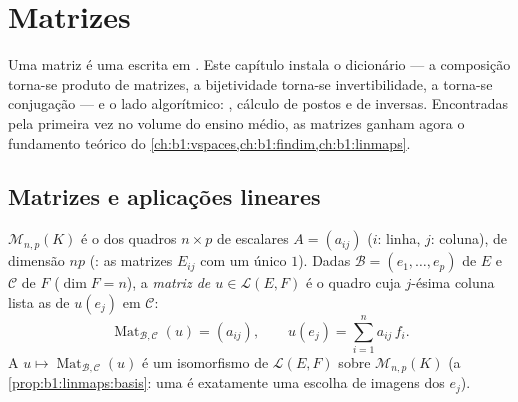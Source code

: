 \chapter{Matrizes}\label{ch:b1:matrices}

Uma matriz é uma  escrita em . Este
capítulo instala o dicionário --- a composição torna-se produto de
matrizes, a bijetividade torna-se invertibilidade, a 
torna-se conjugação --- e o lado algorítmico: ,
cálculo de postos e de inversas. Encontradas pela primeira vez no
volume do ensino médio, as matrizes ganham agora o fundamento teórico
do \cref{ch:b1:vspaces,ch:b1:findim,ch:b1:linmaps}.

\section{Matrizes e aplicações lineares}

\begin{definition}\label{def:b1:matrices:def}
$\mathcal{M}_{n,p}(K)$ é o  dos quadros $n \times p$ de escalares $A
= (a_{ij})$ ($i$:
linha, $j$: coluna), de dimensão $np$ (: as matrizes $E_{ij}$
com um único $1$). Dadas  $\mathcal{B} = (e_1, \dots, e_p)$ de $E$ e $\mathcal{C}$ de $F$ ($\dim F = n$),
a \emph{matriz de $u \in \mathcal{L}(E, F)$} é o quadro cuja $j$-ésima coluna lista as
 de $u(e_j)$ em $\mathcal{C}$:
\[
\operatorname{Mat}_{\mathcal{B},\mathcal{C}}(u) = (a_{ij}),
\qquad u(e_j) = \sum_{i=1}^{n} a_{ij}\, f_i .
\]
A  $u \mapsto \operatorname{Mat}_{\mathcal{B},\mathcal{C}}(u)$ é um isomorfismo de $\mathcal{L}(E, F)$ sobre $\mathcal{M}_{n,p}(K)$ (a \cref{prop:b1:linmaps:basis}:
uma  é exatamente uma escolha de imagens dos $e_j$).
\end{definition}

